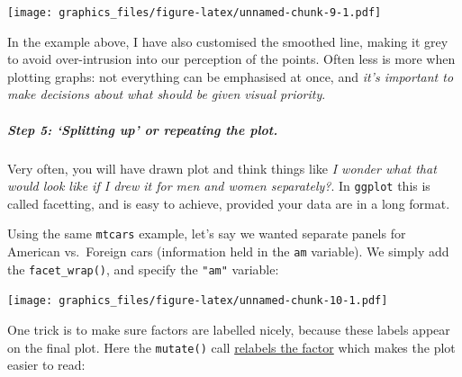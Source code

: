 \documentclass[]{article}
\newenvironment{Shaded}{\begin{snugshade}}{\end{snugshade}}
\newcommand{\DataTypeTok}[1]{\textcolor[rgb]{0.13,0.29,0.53}{#1}}
\newcommand{\DecValTok}[1]{\textcolor[rgb]{0.00,0.00,0.81}{#1}}
\newcommand{\KeywordTok}[1]{\textcolor[rgb]{0.13,0.29,0.53}{\textbf{#1}}}
\newcommand{\NormalTok}[1]{#1}
\newcommand{\OperatorTok}[1]{\textcolor[rgb]{0.81,0.36,0.00}{\textbf{#1}}}
\newcommand{\StringTok}[1]{\textcolor[rgb]{0.31,0.60,0.02}{#1}}
\let\oldsubparagraph\subparagraph
\renewcommand{\subparagraph}[1]{\oldsubparagraph{#1}\mbox{}}
\begin{document}
\texttt{[image: graphics\_files/figure-latex/unnamed-chunk-9-1.pdf]}

In the example above, I have also customised the smoothed line, making it grey
to avoid over-intrusion into our perception of the points. Often less is more
when plotting graphs: not everything can be emphasised at once, and \emph{it's
important to make decisions about what should be given visual priority}.

\hypertarget{step-5-splitting-up-or-repeating-the-plot.}{%
\subparagraph{Step 5: `Splitting up' or repeating the plot.}\label{step-5-splitting-up-or-repeating-the-plot.}}

Very often, you will have drawn plot and think things like \emph{I wonder what that
would look like if I drew it for men and women separately?}. In \texttt{ggplot} this is
called facetting, and is easy to achieve, provided your data are in a long
format.

Using the same \texttt{mtcars} example, let's say we wanted separate panels for
American vs.~Foreign cars (information held in the \texttt{am} variable). We simply add
the \texttt{facet\_wrap()}, and specify the \texttt{"am"} variable:

\begin{Shaded}
\end{Shaded}

\texttt{[image: graphics\_files/figure-latex/unnamed-chunk-10-1.pdf]}

One trick is to make sure factors are labelled nicely, because these labels
appear on the final plot. Here the \texttt{mutate()} call
\href{real-data.html\#factors-and-numerics}{relabels the factor} which makes the plot
easier to read:
\end{document}
